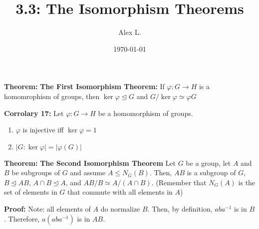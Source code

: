 \documentclass{article}
\title{3.3: The Isomorphism Theorems}
\author{Alex L.}
\date{\today}
\begin{document}
\maketitle

\textbf{Theorem:} \textbf{The First Isomorphism Theorem:} If $\varphi : G \rightarrow H$ is a homomrophism of groups, then $\ker \varphi \trianglelefteq G$ and $G/ \ker \varphi  \simeq \varphi G$

\textbf{Corrolary 17:} Let $\varphi : G \rightarrow H$ be a homomorphism of groups.
\begin{enumerate}
    \item $\varphi $ is injective iff $\ker \varphi = 1$
    \item $\vert G : \ker \varphi \vert = \vert \varphi (G) \vert$
\end{enumerate}  

\textbf{Theorem:} \textbf{The Second Isomorphism Theorem} Let $G$ be a group, let $A$ and $B$ be subgroups of $G$ and assume $A \leq N_G(B)$. Then, $AB$ is a subgroup of $G$, $B \trianglelefteq AB$, $A \cap B \trianglelefteq A$, and $AB/B \simeq A/(A\cap B)$. (Remember that $N_G(A)$ is the set of elements in $G$ that commute with all elements in $A$)

\textbf{Proof:} Note: all elements of $A$ do normalize $B$. Then, by definition, $aba ^{-1}$ is in $B$. Therefore, $a (aba ^{-1})$ is in $AB$. 
\end{document}

